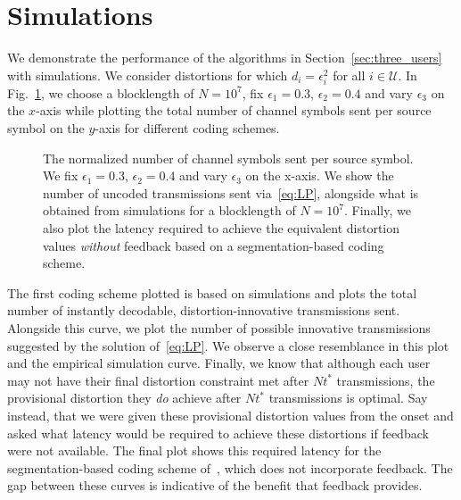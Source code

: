 \section{Simulations}
\label{sec:simulations}

We demonstrate the performance of the algorithms in Section~\ref{sec:three_users} with simulations.  We consider distortions for which $d_i = \epsilon_i^{2}$ for all $i \in \mathcal{U}$.  In Fig.~\ref{fig:t_star}, we choose a blocklength of $N=10^7$, fix $\epsilon_1 = 0.3$, $\epsilon_2 = 0.4$ and vary $\epsilon_3$ on the $x$-axis while plotting the total number of channel symbols sent per source symbol on the $y$-axis for different coding schemes.  
%
\begin{figure}
	\centering
	\setlength\figurewidth{2.65in} 
\setlength\figureheight{2.07in} 
	
	\caption{The normalized number of channel symbols sent per source symbol.  We fix $\epsilon_1=0.3$, $\epsilon_2=0.4$ and vary $\epsilon_3$ on the x-axis.  We show the number of uncoded transmissions sent via~\eqref{eq:LP}, alongside what is obtained from simulations  for a blocklength of $N=10^7$.  Finally, we also plot the latency required to achieve the equivalent distortion values \emph{without} feedback based on a segmentation-based coding scheme.}
	\label{fig:t_star}
\end{figure}
%
The first coding scheme plotted is based on simulations and plots the total number of instantly decodable, distortion-innovative transmissions sent.  Alongside this curve, we plot the number of possible innovative transmissions suggested by the solution of~\eqref{eq:LP}.  We observe a close resemblance in this plot and the empirical simulation curve. Finally, we know that although each user may not have their final distortion constraint met after $Nt^{*}$ transmissions, the provisional distortion they \emph{do} achieve after $Nt^{*}$ transmissions is optimal.  Say instead, that we were given these provisional distortion values from the onset and asked what latency would be required to achieve these distortions if feedback were not available.  The final plot shows this required latency for the segmentation-based coding scheme of~\cite{LTKS_ISIT14}, which does not incorporate feedback. The gap between these curves is indicative of the benefit that feedback provides.

